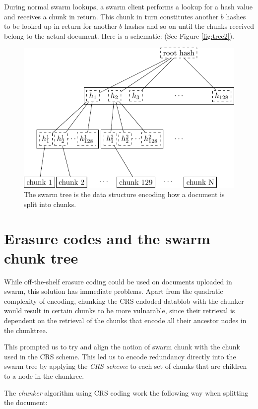 \documentclass[12pt]{article}
\begin{document}
During normal swarm lookups, a swarm client performs a lookup for a hash value and receives a chunk in return. This chunk in turn constitutes another $b$ hashes to be looked up in return for another $b$ hashes and so on until the chunks received belong to the actual document. Here is a schematic: (See Figure \ref{fig:tree2}).


\begin{figure}[htbp]
   \centering
   \includegraphics{fig/tree2.pdf} %
   \caption{ The swarm tree is the data structure encoding how a document is split into chunks.}
   \label{fig:treebasic}
\end{figure}

\section{Erasure codes and the swarm chunk tree}

While off-the-shelf erasure coding could be used on documents uploaded in swarm, this solution has immediate problems. Apart from the quadratic complexity of encoding, chunking the CRS endoded datablob with the chunker would result in certain chunks to be more vulnarable, since their retrieval is dependent on the retrieval of the chunks that encode all their ancestor nodes in the chunktree.

This prompted us to try and align the notion of swarm chunk with the chunk used in the CRS scheme. This led us to encode redundancy directly into the swarm tree by applying the \emph{CRS scheme}  to each set of chunks that are children to a node in the chunkree.

The \emph{chunker} algorithm using CRS coding work the following way when splitting the document:
\end{document}
